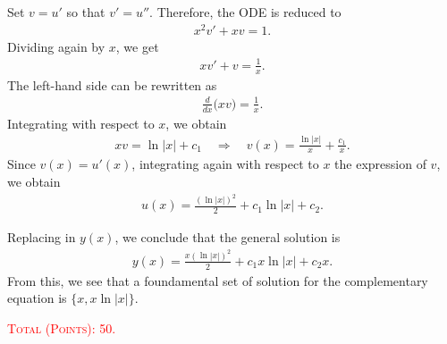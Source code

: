 \documentclass[12pt]{article}
\newcommand{\op}{\left(}
\newcommand{\fp}{\right)}
\newcommand{\Ra}{\Rightarrow}
\begin{document}
	Set $v = u'$ so that $v' = u''$. Therefore, the ODE is reduced to
		\begin{align*}
		x^2 v' + x v = 1 .
		\end{align*}
	Dividing again by $x$, we get
		\begin{align*}
		x v' + v = \frac{1}{x} .
		\end{align*}
	The left-hand side can be rewritten as
		\begin{align*}
		\frac{d}{dx} \big( xv \big) = \frac{1}{x} .
		\end{align*}
	Integrating with respect to $x$, we obtain
		\begin{align*}
		xv = \ln|x| + c_1 \quad \Ra \quad v(x) = \frac{\ln|x|}{x} + \frac{c_1}{x} .
		\end{align*}
	Since $v(x) = u' (x)$, integrating again with respect to $x$ the expression of $v$, we obtain
		\begin{align*}
		u(x) = \frac{\op \ln |x| \fp^2}{2} + c_1 \ln|x| + c_2 .
		\end{align*}
		
	Replacing in $y(x)$, we conclude that the general solution is
		\begin{align*}
		y(x) = \frac{x (\ln |x|)^2}{2} + c_1 x \ln|x| + c_2 x .
		\end{align*}
	From this, we see that a foundamental set of solution for the complementary equation is $\{ x  , x \ln |x| \}$.
	
	\vfill
	
	\hfill \textcolor{red}{\textsc{Total (Points): 50.}}
	
	
	
\end{document}
